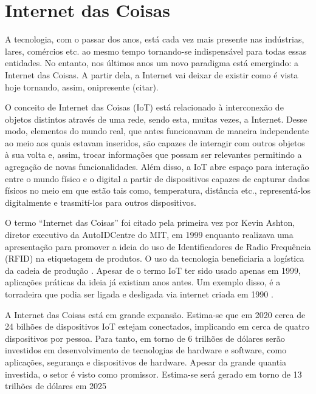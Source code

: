 \chapter{Internet das Coisas}
\label{cap:internet_of_things}




A tecnologia, com o passar dos anos, está cada vez mais presente nas indústrias, lares, comércios etc. ao mesmo tempo tornando-se indispensável para todas essas entidades. No entanto, nos últimos anos um novo paradigma está emergindo: a Internet das Coisas. A partir dela, a Internet vai deixar de existir como é vista hoje tornando, assim, onipresente (citar).


O conceito de Internet das Coisas (IoT) está relacionado à interconexão de objetos distintos através de uma rede, sendo esta, muitas vezes, a Internet. Desse modo, elementos do mundo real, que antes funcionavam de maneira independente ao meio aos quais estavam inseridos, são capazes de interagir com outros objetos à sua volta e, assim, trocar informações que possam ser relevantes permitindo a agregação de novas funcionalidades.  Além disso, a IoT abre espaço para interação 
entre o mundo físico e o digital a partir de dispositivos capazes de capturar dados físicos no meio em que estão tais como, temperatura, distância etc., representá-los digitalmente e trasmití-los para outros dispositivos.

	
O termo ``Internet das Coisas'' foi citado pela primeira vez por Kevin Ashton, diretor executivo da AutoIDCentre do MIT, em 1999 enquanto realizava uma apresentação para promover a ideia do uso de Identificadores de Radio Frequência (RFID) na etiquetagem de produtos. O uso da tecnologia beneficiaria a logística da cadeia de produção \cite{Finep2015}. Apesar de o termo IoT ter sido usado apenas em 1999, aplicações práticas da ideia já existiam anos antes. Um exemplo disso, é a torradeira que podia ser ligada e desligada via internet criada em 1990 \cite{Suresh2014}.


A Internet das Coisas está em grande expansão. Estima-se que em 2020 cerca de 24 bilhões de dispositivos IoT estejam conectados, implicando em cerca de quatro dispositivos por pessoa. Para tanto, em torno de 6 trilhões de dólares serão investidos em desenvolvimento de tecnologias de hardware e software, como aplicações, segurança e dispositivos de hardware. Apesar da grande quantia investida, o setor é visto como promissor. Estima-se será gerado em torno de 13 trilhões de dólares em 2025 \cite{Meola2016}

